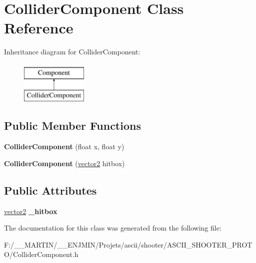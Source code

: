 \hypertarget{class_collider_component}{}\section{Collider\+Component Class Reference}
\label{class_collider_component}
Inheritance diagram for Collider\+Component\+:\begin{figure}[H]
\begin{center}
\leavevmode
\includegraphics[height=2.000000cm]{class_collider_component}
\end{center}
\end{figure}
\subsection*{Public Member Functions}
\begin{DoxyCompactItemize}
\item 
\hypertarget{class_collider_component_a879db27a552a7dd9642a8fc6e36616cd}{}\label{class_collider_component_a879db27a552a7dd9642a8fc6e36616cd} 
{\bfseries Collider\+Component} (float x, float y)
\item 
\hypertarget{class_collider_component_a952c8989df7be45036d88ff5c5ab3e0a}{}\label{class_collider_component_a952c8989df7be45036d88ff5c5ab3e0a} 
{\bfseries Collider\+Component} (\hyperlink{structvector2}{vector2} hitbox)
\end{DoxyCompactItemize}
\subsection*{Public Attributes}
\begin{DoxyCompactItemize}
\item 
\hypertarget{class_collider_component_a9d1e72e0e45b58f19d644aae2fd2ee4c}{}\label{class_collider_component_a9d1e72e0e45b58f19d644aae2fd2ee4c} 
\hyperlink{structvector2}{vector2} {\bfseries \+\_\+hitbox}
\end{DoxyCompactItemize}


The documentation for this class was generated from the following file\+:\begin{DoxyCompactItemize}
\item 
F\+:/\+\_\+\+\_\+\+M\+A\+R\+T\+I\+N/\+\_\+\+\_\+\+E\+N\+J\+M\+I\+N/\+Projets/ascii/shooter/\+A\+S\+C\+I\+I\+\_\+\+S\+H\+O\+O\+T\+E\+R\+\_\+\+P\+R\+O\+T\+O/Collider\+Component.\+h\end{DoxyCompactItemize}
